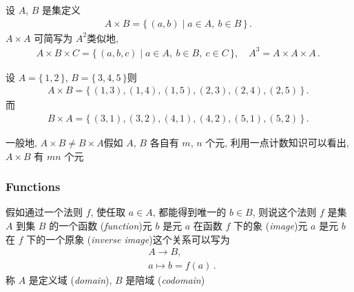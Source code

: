 \begin{definition}
    设 $A$, $B$ 是集\period 定义
    \begin{align*}
        A \times B = \{\, (a,b) \mid a \in A, \ b \in B  \,\} \period
    \end{align*}
    $A \times A$ 可简写为 $A^2$\period 类似地,
    \begin{align*}
        A \times B \times C = \{\, (a,b,c) \mid a \in A, \ b \in B, \ c \in C  \,\}, \quad A^3 = A \times A \times A \period
    \end{align*}
\end{definition}

\begin{example}
    设 $A = \{\, 1,2 \,\}$, $B = \{\, 3,4,5 \,\}$\period 则
    \begin{align*}
        A \times B = \{\, (1,3),(1,4),(1,5),(2,3),(2,4),(2,5) \,\}\period
    \end{align*}
    而
    \begin{align*}
        B \times A = \{\, (3,1),(3,2),(4,1),(4,2),(5,1),(5,2) \,\}\period
    \end{align*}
\end{example}

\begin{remark}
    一般地, $A \times B \neq B \times A$\period 假如 $A$, $B$ 各自有 $m$, $n$ 个元, 利用一点计数知识可以看出, $A \times B$ 有 $mn$ 个元\period
\end{remark}

\subsubsection*{Functions}

\begin{definition}
    假如通过一个法则 $f$, 使任取 $a \in A$, 都能得到唯一的 $b \in B$, 则说这个法则 $f$ 是集 $A$ 到集 $B$ 的一个函数 (\textit{function})\period 元 $b$ 是元 $a$ 在函数 $f$ 下的象 (\textit{image})\period 元 $a$ 是元 $b$ 在 $f$ 下的一个原象 (\textit{inverse image})\period 这个关系可以写为
    \begin{align*}
         & A \to B,  \tag*{$f$:}      \\
         & a \mapsto b = f(a) \period
    \end{align*}
    称 $A$ 是定义域 (\textit{domain}), $B$ 是陪域 (\textit{codomain})\period
\end{definition}

